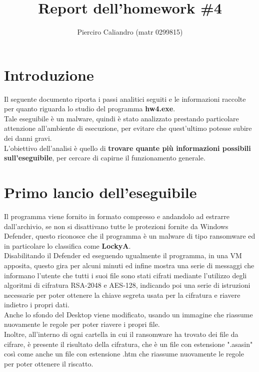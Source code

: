 \documentclass[12pt]{extarticle}
\author{Pierciro Caliandro (matr 0299815)}
\title{Report dell'homework \#4}
\date{}
\begin{document}
\maketitle
\section{Introduzione}
Il seguente documento riporta i passi analitici seguiti e le informazioni raccolte per quanto riguarda lo studio del programma \textbf{hw4.exe}.\\Tale eseguibile è un malware, quindi è stato analizzato prestando particolare attenzione all'ambiente di esecuzione, per evitare che quest'ultimo potesse subire dei danni gravi.\\L'obiettivo dell'analisi è quello di \textbf{trovare quante più informazioni possibili sull'eseguibile}, per cercare di capirne il funzionamento generale.
\section{Primo lancio dell'eseguibile}
Il programma viene fornito in formato compresso e andandolo ad estrarre dall'archivio, se non si disattivano tutte le protezioni fornite da Windows Defender, questo riconosce che il programma è un malware di tipo ransomware ed in particolare lo classifica come \textbf{LockyA}.\\Disabilitando il Defender ed eseguendo ugualmente il programma, in una VM apposita, questo gira per alcuni minuti ed infine mostra una serie di messaggi che informano l'utente che tutti i suoi file sono stati cifrati mediante l'utilizzo degli algoritmi di cifratura RSA-2048 e AES-128, indicando poi una serie di istruzioni necessarie per poter ottenere la chiave segreta usata per la cifratura e riavere indietro i propri dati.\\Anche lo sfondo del Desktop viene modificato, usando un immagine che riassume nuovamente le regole per poter riavere i propri file.\\Inoltre, all'interno di ogni cartella in cui il ransomware ha trovato dei file da cifrare, è presente il risultato della cifratura, che è un file con estensione ".asasin" così come anche un file con estensione .htm che riassume nuovamente le regole per poter ottenere il riscatto.  
\end{document}
